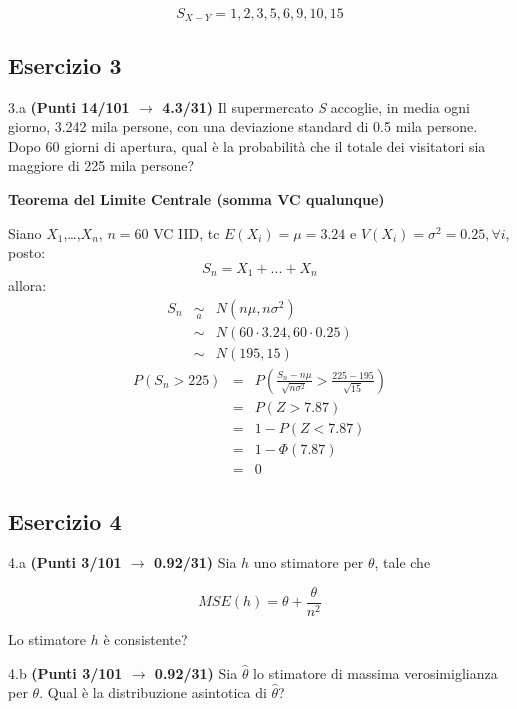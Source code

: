\documentclass[
  11pt,
]{book}
\theoremstyle{mytheoremstyle}
\theoremstyle{mydefstyle}
\newenvironment{sol}
  {
  \begin{tcolorbox}[enhanced,breakable,arc=0.1mm,boxrule=1pt,colback=white,colframe=iblue,
  title=\bf \fontfamily{lmss}\selectfont \hspace{.5 cm} Soluzione,drop fuzzy shadow]

}{
\end{tcolorbox}
  }
\begin{document}
\begin{sol}
\[S_{X-Y}=1, 2, 3, 5, 6, 9, 10, 15\]

\end{sol}

\subsection{Esercizio 3}\label{esercizio-3-17}

3.a \textbf{(Punti 14/101 \(\rightarrow\) 4.3/31)} Il supermercato \emph{S} accoglie, in media ogni giorno, 3.242 mila persone, con una
deviazione standard di 0.5 mila persone. Dopo 60 giorni di apertura, qual è la probabilità che il
totale dei visitatori sia maggiore di 225 mila persone?

\textbf{Teorema del Limite Centrale (somma VC qualunque)}

Siano \(X_1\),\ldots,\(X_n\), \(n=60\) VC IID, tc \(E(X_i)=\mu=3.24\) e \(V(X_i)=\sigma^2=0.25,\forall i\), posto:
\[
      S_n = X_1 + ... + X_n
      \]
allora:\begin{eqnarray*}
  S_n & \mathop{\sim}\limits_{a}& N(n\mu,n\sigma^2) \\
     &\sim & N(60\cdot3.24,60\cdot0.25) \\
     &\sim & N(195,15) 
  \end{eqnarray*}\begin{eqnarray*}
      P( S_n   >   225 ) 
        &=& P\left(  \frac { S_n  -  n\mu }{ \sqrt{n\sigma^2} }  >  \frac { 225  -  195 }{\sqrt{ 15 }} \right)  \\
                 &=& P\left(  Z   >   7.87 \right) \\    &=& 1-P(Z< 7.87 )\\ 
                 &=&  1-\Phi( 7.87 ) \\ &=&  0 
      \end{eqnarray*}

\subsection{Esercizio 4}\label{esercizio-4-17}

4.a \textbf{(Punti 3/101 \(\rightarrow\) 0.92/31)} Sia \(h\) uno stimatore per \(\theta\), tale che

\[
MSE(h) =  \theta+\frac{\theta}{n^2}
\]

Lo stimatore \(h\) è consistente?

4.b \textbf{(Punti 3/101 \(\rightarrow\) 0.92/31)} Sia \(\hat\theta\) lo stimatore di massima verosimiglianza
per \(\theta\). Qual è la distribuzione asintotica di \(\hat\theta\)?
\end{document}
